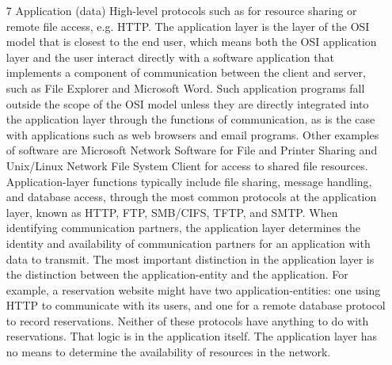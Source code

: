 \documentclass{article}
\begin{document}
\begin{enumerate}[label = \arabic*]
\item[7] Application (data) High-level protocols such as for resource sharing or remote file access, e.g. HTTP. 
	\subitem The application layer is the layer of the OSI model that is closest to the end user, which means both the OSI application layer and the user interact directly with a software application that implements a component of communication between the client and server, such as File Explorer and Microsoft Word. Such application programs fall outside the scope of the OSI model unless they are directly integrated into the application layer through the functions of communication, as is the case with applications such as web browsers and email programs. Other examples of software are Microsoft Network Software for File and Printer Sharing and Unix/Linux Network File System Client for access to shared file resources. Application-layer functions typically include file sharing, message handling, and database access, through the most common protocols at the application layer, known as HTTP, FTP, SMB/CIFS, TFTP, and SMTP. When identifying communication partners, the application layer determines the identity and availability of communication partners for an application with data to transmit. The most important distinction in the application layer is the distinction between the application-entity and the application. For example, a reservation website might have two application-entities: one using HTTP to communicate with its users, and one for a remote database protocol to record reservations. Neither of these protocols have anything to do with reservations. That logic is in the application itself. The application layer has no means to determine the availability of resources in the network.


\end{enumerate}
\end{document}
